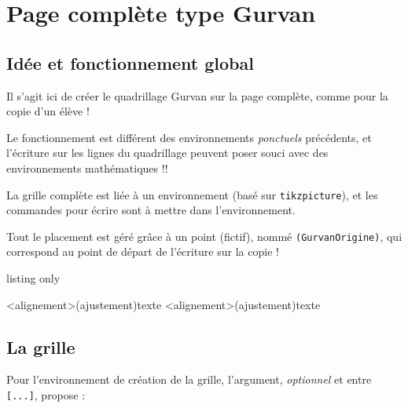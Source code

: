 \documentclass[a4paper]{article}
\begin{document}
\section{Page complète type Gurvan}

\subsection{Idée et fonctionnement global}

Il s'agit ici de créer le quadrillage Gurvan sur la page complète, comme pour la copie d'un élève !

\smallskip

\faBomb{} Le fonctionnement est différent des environnements \textit{ponctuels} précédents, et l'écriture sur les lignes du quadrillage peuvent poser souci avec des environnements mathématiques !!

\medskip

La grille complète est liée à un environnement (basé sur \texttt{tikzpicture}), et les commandes pour écrire sont à mettre dans l'environnement.

\smallskip

Tout le placement est géré grâce à un point (fictif), nommé \texttt{(GurvanOrigine)}, qui correspond au point de départ de l'écriture sur la copie !
%
\begin{PresentationCode}{listing only}
\begin{PleinePageGurvan}[options]
	\LigneGurvan[options]<alignement>(ajustement){texte}
	\ParagrapheGurvan[options]<alignement>(ajustement){texte}
\end{PleinePageGurvan}
\end{PresentationCode}

\subsection{La grille}

Pour l'environnement de création de la grille, l'argument, \textit{optionnel} et entre \texttt{[...]}, propose :
\end{document}
